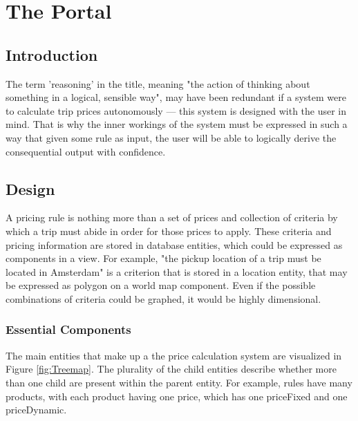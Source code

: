 \graphicspath{{Chapter5/Figs/Vector/}{Chapter5/Figs/}}

\chapter{The Portal}
\section{Introduction}
The term 'reasoning' in the title, meaning "the action of thinking about something in a logical, sensible way", may have been redundant if a system were to calculate trip prices autonomously --- this system is designed with the user in mind. That is why the inner workings of the system must be expressed in such a way that given some rule as input, the user will be able to logically derive the consequential output with confidence.

\section{Design}
A pricing rule is nothing more than a set of prices and collection of criteria by which a trip must abide in order for those prices to apply. These criteria and pricing information are stored in database entities, which could be expressed as components in a view. For example, "the pickup location of a trip must be located in Amsterdam" is a criterion that is stored in a location entity, that may be expressed as polygon on a world map component. Even if the possible combinations of criteria could be graphed, it would be highly dimensional.

\subsection{Essential Components}
The main entities that make up a the price calculation system are visualized in Figure \ref{fig:Treemap}. The plurality of the child entities describe whether more than one child are present within the parent entity. For example, rules have many products, with each product having one price, which has one priceFixed and one priceDynamic.


